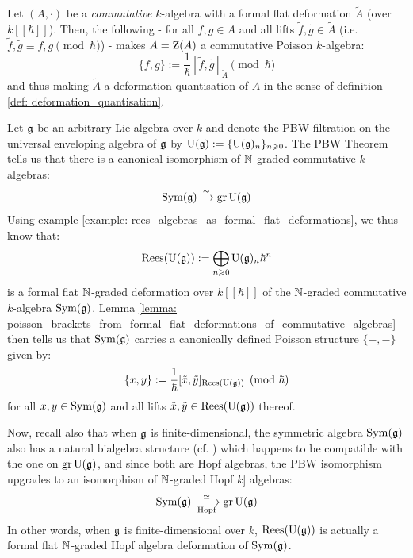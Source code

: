         \begin{corollary} \label{coro: deformation_quantisation_of_poisson_algebras_from_formal_flat_deformations}
            Let $(A, \cdot)$ be a \textit{commutative} $k$-algebra with a formal flat deformation $\tilde{A}$ (over $k[\![\hbar]\!]$). Then, the following - for all $f, g \in A$ and all lifts $\tilde{f}, \tilde{g} \in \tilde{A}$ (i.e. $\tilde{f}, \tilde{g} \equiv f, g \pmod{\hbar}$) - makes $A = \mathrm{Z}(A)$ a commutative Poisson $k$-algebra:
                $$\{f, g\} := \frac{1}{\hbar}[\tilde{f}, \tilde{g}]_{\tilde{A}} \pmod{\hbar}$$
            and thus making $\tilde{A}$ a deformation quantisation of $A$ in the sense of definition \ref{def: deformation_quantisation}.
        \end{corollary}
        \begin{example} \label{example: PBW_deformations}
            Let $\mathfrak{g}$ be an arbitrary Lie algebra over $k$ and denote the PBW filtration on the universal enveloping algebra of $\mathfrak{g}$ by $\mathrm{U}(\mathfrak{g}) := \{\mathrm{U}(\mathfrak{g})_n\}_{n \geqslant 0}$. The PBW Theorem tells us that there is a canonical isomorphism of $\mathbb{N}$-graded commutative $k$-algebras:
                $$\operatorname{Sym}(\mathfrak{g}) \xrightarrow[]{\simeq} \operatorname{gr} \mathrm{U}(\mathfrak{g})$$
            Using example \ref{example: rees_algebras_as_formal_flat_deformations}, we thus know that:
                $$\operatorname{Rees}(\mathrm{U}(\mathfrak{g})) := \bigoplus_{n \geqslant 0} \mathrm{U}(\mathfrak{g})_n \hbar^n$$
            is a formal flat $\mathbb{N}$-graded deformation over $k[\![\hbar]\!]$ of the $\mathbb{N}$-graded commutative $k$-algebra $\operatorname{Sym}(\mathfrak{g})$. Lemma \ref{lemma: poisson_brackets_from_formal_flat_deformations_of_commutative_algebras} then tells us that $\operatorname{Sym}(\mathfrak{g})$ carries a canonically defined Poisson structure $\{-, -\}$ given by:
                $$\{x, y\} := \frac{1}{\hbar}[\tilde{x}, \tilde{y}]_{\operatorname{Rees}(\mathrm{U}(\mathfrak{g}))} \pmod{\hbar}$$
            for all $x, y \in \operatorname{Sym}(\mathfrak{g})$ and all lifts $\tilde{x}, \tilde{y} \in \operatorname{Rees}(\mathrm{U}(\mathfrak{g}))$ thereof. 

            Now, recall also that when $\mathfrak{g}$ is finite-dimensional, the symmetric algebra $\operatorname{Sym}(\mathfrak{g})$ also has a natural bialgebra structure (cf. \cite[Chapter III]{kassel_quantum_groups}) which happens to be compatible with the one on $\operatorname{gr} \mathrm{U}(\mathfrak{g})$, and since both are Hopf algebras, the PBW isomorphism upgrades to an isomorphism of $\mathbb{N}$-graded Hopf $k$]
            algebras:
                $$\operatorname{Sym}(\mathfrak{g}) \xrightarrow[\text{Hopf}]{\simeq} \operatorname{gr} \mathrm{U}(\mathfrak{g})$$
            In other words, when $\mathfrak{g}$ is finite-dimensional over $k$, $\operatorname{Rees}(\mathrm{U}(\mathfrak{g}))$ is actually a formal flat $\mathbb{N}$-graded Hopf algebra deformation of $\operatorname{Sym}(\mathfrak{g})$. 
        \end{example}
    
